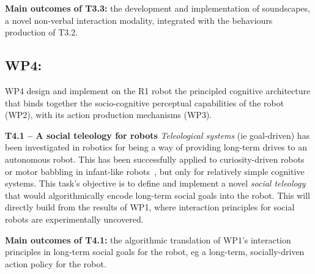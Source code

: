 \begin{framed}
    {\noindent\bf Main outcomes of T3.3:} the development and implementation of
    soundscapes, a novel non-verbal interaction modality, integrated with the
    behaviours production of T3.2.
\end{framed}



\subsection{WP4: \textbf{\wpFour}}

WP4 design and implement on the R1 robot the principled cognitive architecture
that binds together the socio-cognitive perceptual capabilities of the robot
(WP2), with its action production mechanisms (WP3).

\textbf{T4.1 -- A social teleology for robots}
\emph{Teleological systems} (ie goal-driven) has been investigated in robotics
for being a way of providing long-term drives to an autonomous robot. This has
been successfully applied to curiosity-driven robots~\cite{oudeyer2005playground} or motor babbling in infant-like
robots~\cite{forestier2017unified}, but only for relatively simple cognitive
systems. This task's objective is to define and implement a novel \emph{social teleology} that would
algorithmically encode long-term social goals into the robot. This will directly
build from the results of WP1, where interaction principles for social robots
are experimentally uncovered.

\begin{framed}
    {\noindent\bf Main outcomes of T4.1:} the algorithmic translation of WP1's
    interaction principles in long-term social goals for the robot, eg a
    long-term, socially-driven action policy for the robot.
\end{framed}

